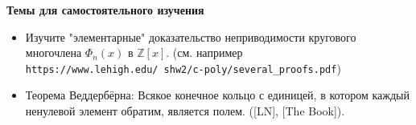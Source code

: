 \noindent\textbf{Темы для самостоятельного изучения}
\begin{itemize}[topsep=0pt]
    \item Изучите "элементарные" доказательство неприводимости кругового многочлена $\Phi_n(x)$ в $\mathbb{Z}[x]$.
    (см. например\\ \texttt{https://www.lehigh.edu/~shw2/c-poly/several\_proofs.pdf})
    \item Теорема Веддербёрна: Всякое конечное кольцо с единицей, в котором каждый ненулевой элемент обратим, является полем. ([LN], [The Book]).
\end{itemize}
